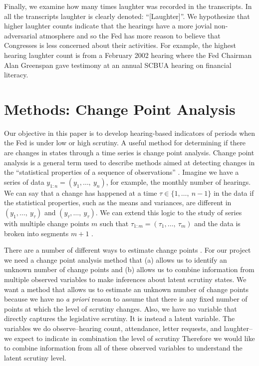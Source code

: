 \documentclass[a4paper]{article}\usepackage[]{graphicx}\usepackage[]{color}
\begin{document}
Finally, we examine how many times laughter was recorded in the transcripts. In all the transcripts laughter is clearly denoted: ``[Laughter]''. We hypothesize that higher laughter counts indicate that the hearings have a more jovial non-adversarial atmosphere and so the Fed has more reason to believe that Congresses is less concerned about their activities. For example, the highest hearing laughter count is from a February 2002 hearing where the Fed Chairman Alan Greenspan gave testimony at an annual SCBUA hearing on financial literacy.

\section{Methods: Change Point Analysis}

Our objective in this paper is to develop hearing-based indicators of periods when the Fed is under low or high scrutiny. A useful method for determining if there are changes in states through a time series is change point analysis. Change point analysis is a general term used to describe methods aimed at detecting changes in the ``statistical properties of a sequence of observations'' \cite[2]{Killick2013}. Imagine we have a series of data $y_{1:n} = (y_{1},\ldots,\: y_{n})$, for example, the monthly number of hearings.  We can say that a change has happened at a time $\tau \in \{1,\ldots,\:n-1\}$ in the data if the statistical properties, such as the means and variances, are different in $(y_{1},\ldots,\: y_{\tau})$ and $(y_{\tau},\ldots,\: y_{\tau})$. We can extend this logic to the study of series with multiple change points $m$ such that $\tau_{1:m} = (\tau_{1},\ldots,\:\tau_{m})$ and the data is broken into segments $m + 1$ \citep{Killick2012,Killick2013}.

There are a number of different ways to estimate change points \cite[see][]{Killick2013,Matteson2014}. For our project we need a change point analysis method that (a) allows us to identify an unknown number of change points and (b) allows us to combine information from multiple observed variables to make inferences about latent scrutiny states. We want a method that allows us to estimate an unknown number of change points because we have no \emph{a priori} reason to assume that there is any fixed number of points at which the level of scrutiny changes. Also, we have no variable that directly captures the legislative scrutiny. It is instead a latent variable. The variables we do observe--hearing count, attendance, letter requests, and laughter--we expect to indicate in combination the level of scrutiny  Therefore we would like to combine information from all of these observed variables to understand the latent scrutiny level.
\end{document}
